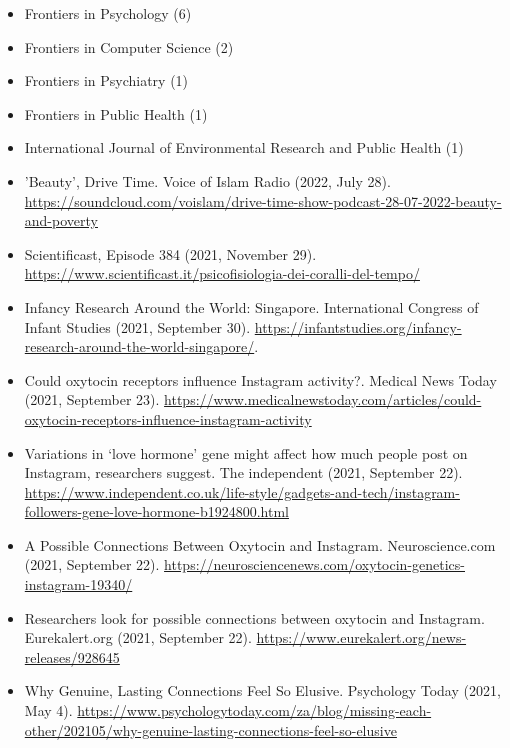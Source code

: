\documentclass[10pt,a4paper]{altacv}
\begin{document}
\begin{fullwidth}
		\begin{itemize}
			\item Frontiers in Psychology (6)
			\item Frontiers in Computer Science (2)
			\item Frontiers in Psychiatry (1)
			\item Frontiers in Public Health (1)
			\item International Journal of Environmental Research and Public Health (1)
			
		\end{itemize}
	
		
		\begin{itemize}
			\item 'Beauty', Drive Time. Voice of Islam Radio (2022, July 28). \url{https://soundcloud.com/voislam/drive-time-show-podcast-28-07-2022-beauty-and-poverty}
			\item Scientificast, Episode 384 (2021, November 29). \url{https://www.scientificast.it/psicofisiologia-dei-coralli-del-tempo/}
			\item Infancy Research Around the World: Singapore. International Congress of Infant Studies (2021, September 30). \url{https://infantstudies.org/infancy-research-around-the-world-singapore/}.
			\item Could oxytocin receptors influence Instagram activity?. Medical News Today (2021, September 23). \url{https://www.medicalnewstoday.com/articles/could-oxytocin-receptors-influence-instagram-activity}
			\item Variations in ‘love hormone’ gene might affect how much people post on Instagram, researchers suggest. The independent (2021, September 22). \url{https://www.independent.co.uk/life-style/gadgets-and-tech/instagram-followers-gene-love-hormone-b1924800.html}
			\item A Possible Connections Between Oxytocin and Instagram. Neuroscience.com (2021, September 22). \url{https://neurosciencenews.com/oxytocin-genetics-instagram-19340/}
			\item Researchers look for possible connections between oxytocin and Instagram. Eurekalert.org (2021, September 22). \url{https://www.eurekalert.org/news-releases/928645}
			\item Why Genuine, Lasting Connections Feel So Elusive. Psychology Today (2021, May 4). \url{https://www.psychologytoday.com/za/blog/missing-each-other/202105/why-genuine-lasting-connections-feel-so-elusive}

\end{itemize}
\end{fullwidth}
\end{document}
